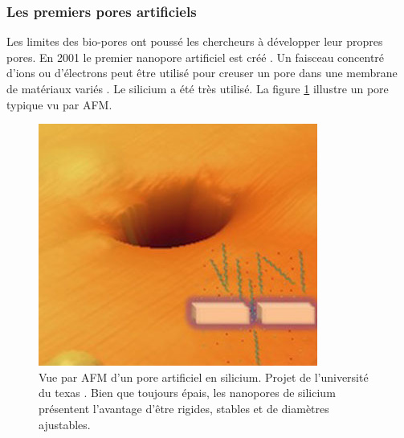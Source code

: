 \subsubsection{Les premiers pores artificiels}


Les limites des bio-pores ont poussé les chercheurs à développer leur propres pores. En 2001 le premier nanopore artificiel est créé \cite{Li2001}. Un faisceau concentré d'ions ou d'électrons peut être utilisé pour creuser un pore dans une membrane de matériaux variés \cite{Wanunu2010}. Le silicium a été très utilisé. La figure \ref{artpore} illustre un pore typique vu par AFM.




\begin{figure}[h!]
\begin{center}
\begin{minipage}{0.45\linewidth}
\includegraphics[width=\textwidth]{artificialpore.png}
\end{minipage}
\begin{minipage}{0.48\linewidth} 
\caption[Pores artificiels]{Vue par AFM d'un pore artificiel en silicium. Projet de l'université du texas \cite{artpore}. Bien que toujours épais, les nanopores de silicium présentent l'avantage d'être rigides, stables et de diamètres ajustables.}
\label{artpore}
\end{minipage}
\end{center}
\end{figure}

